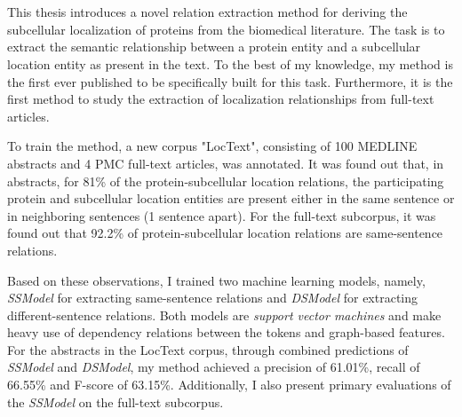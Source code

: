 \chapter{\abstractname}

This thesis introduces a novel relation extraction method for deriving the subcellular localization of proteins from the biomedical literature. The task is to extract the semantic relationship between a protein entity and a subcellular location entity as present in the text. To the best of my knowledge, my method is the first ever published to be specifically built for this task. Furthermore, it is the first method to study the extraction of localization relationships from full-text articles.

To train the method, a new corpus "LocText", consisting of 100 MEDLINE abstracts and 4 PMC full-text articles, was annotated. It was found out that, in abstracts, for 81\% of the protein-subcellular location relations, the participating protein and subcellular location entities are present either in the same sentence or in neighboring sentences (1 sentence apart). For the full-text subcorpus, it was found out that 92.2\% of protein-subcellular location relations are same-sentence relations.

Based on these observations, I trained two machine learning models, namely, \textit{SSModel} for extracting same-sentence relations and \textit{DSModel} for extracting different-sentence relations. Both models are \textit{support vector machines} and make heavy use of dependency relations between the tokens and graph-based features. For the abstracts in the LocText corpus, through combined predictions of \textit{SSModel} and \textit{DSModel}, my method achieved a precision of 61.01\%, recall of 66.55\% and F-score of 63.15\%. Additionally, I also present primary evaluations of the \textit{SSModel} on the full-text subcorpus.